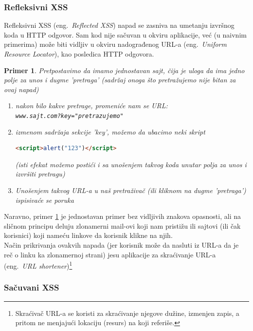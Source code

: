 \documentclass[a4paper]{article}
\newtheorem{primer}{Primer}[section]
\begin{document}
\subsubsection{Refleksivni XSS}

Refleksivni XSS (eng.~{\em Reflected XSS}) napad se zasniva na umetanju izvršnog koda u HTTP odgovor. Sam kod nije sačuvan u okviru aplikacije, već (u naivnim primerima) može biti vidljiv u okviru nadograđenog URL-a (eng.~{\em Uniform Resource Locator}), kao posledica HTTP odgovora.
\begin{primer}
\label{primer1}
Pretpostavimo da imamo jednostavan sajt, čija je uloga da ima jedno polje za unos i dugme 'pretraga' (sadržaj onoga što pretražujemo nije bitan za ovaj napad)
\begin{enumerate}
\item nakon bilo kakve pretrage, promeniće nam se URL:\\
\texttt{www.sajt.com?key="pretrazujemo"}
\item izmenom sadržaja sekcije 'key', možemo da ubacimo neki skript

\begin{lstlisting}[language=HTML]
<script>alert("123")</script>
\end{lstlisting}

(isti efekat možemo postići i sa unošenjem takvog koda unutar polja za unos i izvršiti pretragu)
\item Unošenjem takvog URL-a u naš pretraživač (ili kliknom na dugme 'pretraga') ispisivaće se poruka \\

\end{enumerate}
\end{primer}

 Naravno, primer \ref{primer1} je jednostavan primer bez vidljivih znakova opasnosti, ali na sličnom principu deluju zlonamerni mail-ovi koji nam pristižu ili sajtovi (ili čak korisnici) koji nameću linkove da korisnik klikne na njih.\\
Način prikrivanja ovakvih napada (jer korisnik može da nasluti iz URL-a da je reč o linku ka zlonamernoj strani) jesu aplikacije za skraćivanje URL-a (eng.~{\em URL shortener})\footnote{Skraćivač URL-a se koristi za skraćivanje njegove dužine, izmenjen zapis, a pritom ne menjajući lokaciju (resurs) na koji referiše.}

\subsubsection{Sačuvani XSS}
\end{document}
